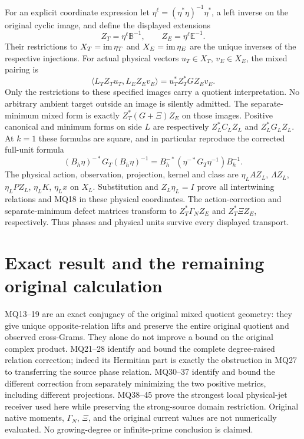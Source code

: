 \documentclass[11pt]{article}
\begin{document}
For an explicit coordinate expression let
$\eta^\ell=(\eta^*\eta)^{-1}\eta^*$, a left inverse on the
original cyclic image, and define the displayed extensions
\[
 Z_T=\eta^\ell\mathbb B^{-1},\qquad
 Z_E=\eta^\ell\mathbb E^{-1}.                               \tag{MQ43}
\]
Their restrictions to $X_T=\operatorname{im}\eta_T$ and $X_E=\operatorname{im}\eta_E$
are the unique inverses of the respective injections. For actual
physical vectors $u_T\in X_T$, $v_E\in X_E$, the mixed pairing is
\[
 \langle L_TZ_Tu_T,L_EZ_Ev_E\rangle
       =u_T^* Z_T^*G Z_Ev_E.                               \tag{MQ44}
\]
Only the restrictions to these specified images carry a quotient
interpretation. No arbitrary ambient target outside an image is
silently admitted. The separate-minimum mixed form is exactly
$Z_T^*(G+\Xi)Z_E$ on those images. Positive canonical and minimum
forms on side $L$ are respectively $Z_L^*C_LZ_L$ and
$Z_L^*G_LZ_L$. At $k=1$ these formulas are square, and in
particular reproduce the corrected full-unit formula
\[
 (B_h\eta)^{-*}G_T(B_h\eta)^{-1}
   =B_h^{-*}(\eta^{-*}G_T\eta^{-1})B_h^{-1}.                \tag{MQ45}
\]
The physical action, observation, projection, kernel and class are
$\eta_L A Z_L$, $\Lambda Z_L$, $\eta_LPZ_L$, $\eta_LK$,
$\eta_Lx$ on $X_L$. Substitution and $Z_L\eta_L=I$ prove
all intertwining relations and MQ18 in these physical coordinates.
The action-correction and separate-minimum defect matrices transform
to $Z_T^*\Gamma_NZ_E$ and $Z_T^*\Xi Z_E$, respectively.
Thus phases and physical units survive every displayed transport.

\section{Exact result and the remaining original calculation}
MQ13--19 are an exact conjugacy of the original mixed quotient
geometry: they give unique opposite-relation lifts and preserve the
entire original quotient and observed cross-Grams. They alone do
not improve a bound on the original complex product. MQ21--28
identify and bound the complete degree-raised relation correction;
indeed its Hermitian part is exactly the obstruction in MQ27 to
transferring the source phase relation. MQ30--37 identify and bound
the different correction from separately minimizing the two
positive metrics, including different projections. MQ38--45 prove
the strongest local physical-jet receiver used here while preserving
the strong-source domain restriction. Original native moments,
$\Gamma_N$, $\Xi$, and the original current values are not numerically
evaluated. No growing-degree or infinite-prime conclusion is claimed.
\end{document}

